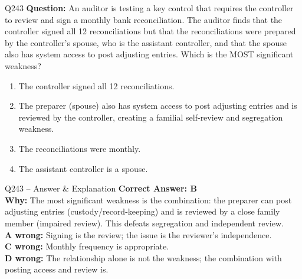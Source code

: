 \documentclass[aspectratio=169,10pt]{beamer}
\begin{document}
	\begin{frame}[t]{Q243}
		\small
		\textbf{Question:} An auditor is testing a key control that requires the controller to review and sign a monthly bank reconciliation. The auditor finds that the controller signed all 12 reconciliations but that the reconciliations were prepared by the controller's spouse, who is the assistant controller, and that the spouse also has system access to post adjusting entries. Which is the MOST significant weakness?
		\begin{enumerate}[label=\Alph*.,itemsep=1pt,topsep=2pt]
			\item The controller signed all 12 reconciliations.
			\item The preparer (spouse) also has system access to post adjusting entries and is reviewed by the controller, creating a familial self-review and segregation weakness.
			\item The reconciliations were monthly.
			\item The assistant controller is a spouse.
		\end{enumerate}
	\end{frame}
	
	\begin{frame}[t]{Q243 -- Answer \& Explanation}
		\small
		\textbf{Correct Answer: B} \\[4pt]
		\textbf{Why:} The most significant weakness is the combination: the preparer can post adjusting entries (custody/record-keeping) and is reviewed by a close family member (impaired review). This defeats segregation and independent review. \\[4pt]
		\textbf{A wrong:} Signing is the review; the issue is the reviewer's independence. \\[2pt]
		\textbf{C wrong:} Monthly frequency is appropriate. \\[2pt]
		\textbf{D wrong:} The relationship alone is not the weakness; the combination with posting access and review is.
	\end{frame}
	
\end{document}
